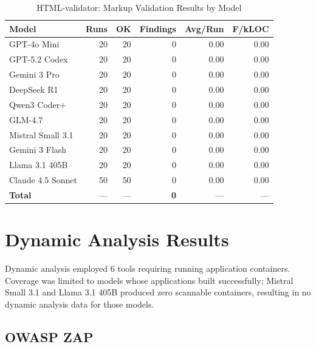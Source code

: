 \begin{table}[htbp]
    \centering
    \caption{HTML-validator: Markup Validation Results by Model}
    \label{tab:tool_htmlvalidator}
    \small
    \begin{tabular}{@{} l r r r r r @{}}
        \toprule
        \textbf{Model} & \textbf{Runs} & \textbf{OK} & \textbf{Findings} & \textbf{Avg/Run} & \textbf{F/kLOC} \\
        \midrule
        GPT-4o Mini & 20 & 20 & 0 & 0.00 & 0.00 \\
        GPT-5.2 Codex & 20 & 20 & 0 & 0.00 & 0.00 \\
        Gemini 3 Pro & 20 & 20 & 0 & 0.00 & 0.00 \\
        DeepSeek R1 & 20 & 20 & 0 & 0.00 & 0.00 \\
        Qwen3 Coder+ & 20 & 20 & 0 & 0.00 & 0.00 \\
        GLM-4.7 & 20 & 20 & 0 & 0.00 & 0.00 \\
        Mistral Small 3.1 & 20 & 20 & 0 & 0.00 & 0.00 \\
        Gemini 3 Flash & 20 & 20 & 0 & 0.00 & 0.00 \\
        Llama 3.1 405B & 20 & 20 & 0 & 0.00 & 0.00 \\
        Claude 4.5 Sonnet & 50 & 50 & 0 & 0.00 & 0.00 \\
        \midrule
        \textbf{Total} & --- & --- & \textbf{0} & --- & --- \\
        \bottomrule
    \end{tabular}
\end{table}

\section{Dynamic Analysis Results}
\label{sec:dynamic_results}

Dynamic analysis employed 6 tools requiring running application containers. Coverage was limited to models whose applications built successfully; Mistral Small 3.1 and Llama 3.1 405B produced zero scannable containers, resulting in no dynamic analysis data for those models.

\subsection{OWASP ZAP}


